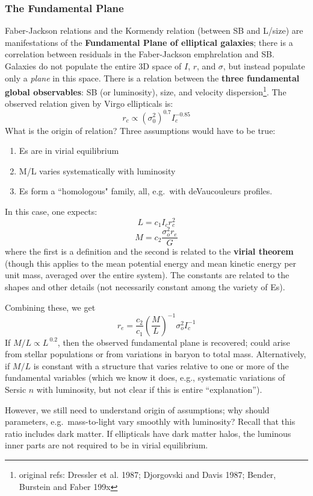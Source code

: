 \documentclass{article}
\begin{document}
\subsubsection{The Fundamental Plane}
Faber-Jackson relations and the Kormendy relation (between SB and L/size) are
manifestations of the \textbf{Fundamental Plane of elliptical galaxies}; there
is a correlation between residuals in the Faber-Jackson emphrelation and SB.
Galaxies do not populate the entire 3D space of $I$, $r$, and $\sigma$, but
instead populate only a \emph{plane} in this space.  There is a relation
between the \textbf{three fundamental global observables}: SB (or luminosity),
size, and velocity dispersion\footnote{original refs: Dressler et al. 1987;
Djorgovski and Davis 1987; Bender, Burstein and Faber 199x}.  The observed
relation given by Virgo ellipticals is:
\[
    r_{c} \propto \left(\sigma_{0}^{2}\right)^{0.7}I_{c}^{-0.85}
\]
What is the origin of relation? Three assumptions would have to be
true:
\begin{enumerate}
    \item Es are in virial equilibrium
    \item M/L varies systematically with luminosity
    \item Es form a ``homologous" family, all, e.g.\ with deVaucouleurs profiles.
\end{enumerate}
In this case, one expects:
\[
    L = c_{1}I_{c}r_{c}^{2}
\]\[
    M = c_{2}\frac{\sigma^{2}_{o}r_{e}}{G}
\]
where the first is a definition and the second is related to the \textbf{virial
theorem} (though this applies to the mean potential energy and mean kinetic
energy per unit mass, averaged over the entire system). The constants are
related to the shapes and other details (not necessarily constant among the
variety of Es).

Combining these, we get
\[
    r_e = \frac{c_{2}}{c_{1}}\left(\frac{M}{L}\right)^{-1}\sigma_{o}^{2}I_{c}^{-1}
\]
If $M/L \propto L^{~0.2}$, then the observed fundamental plane is recovered;
could arise from stellar populations or from variations in baryon to total
mass. Alternatively, if $M/L$ is constant with a structure that varies relative
to one or more of the fundamental variables (which we know it does, e.g.,
systematic variations of Sersic $n$ with luminosity, but not clear if this is
entire ``explanation'').

However, we still need to understand origin of assumptions; why should
parameters, e.g.\ mass-to-light vary smoothly with luminosity?  Recall that
this ratio includes dark matter.  If ellipticals have dark matter halos, the
luminous inner parts are not required to be in virial equilibrium.
\end{document}

